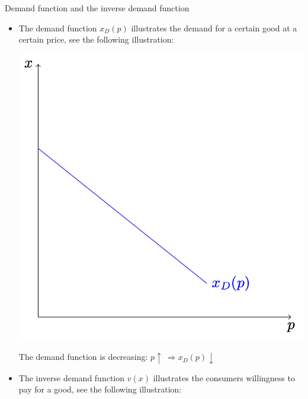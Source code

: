 \begin{theo}{Demand function and the inverse demand function}
    \begin{itemize}
        \item 
            The demand function $x_D(p)$ illustrates the demand for a certain good at a certain price, see the following illustration:
            \begin{center}
                \includegraphics[scale = 0.2]{Images/Demand/DemandFunction.png}
            \end{center}
            The demand function is decreasing: $p \uparrow \ \Rightarrow x_D(p) \downarrow$
        \item  
            The inverse demand function $v(x)$ illustrates the consumers willingness to pay for a good, see the following illustration:
            \begin{center}

\end{center}
\end{itemize}
\end{theo}
